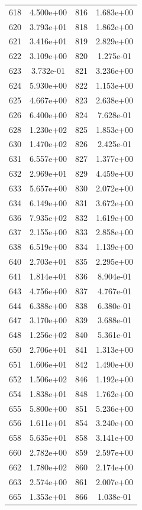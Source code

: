 \documentclass[12pt]{article}
\begin{document}
\begin{longtable}{@{}cccc@{}}
618 & 4.500e+00 & 816 & 1.683e+00 \\
620 & 3.793e+01 & 818 & 1.862e+00 \\
621 & 3.416e+01 & 819 & 2.829e+00 \\
622 & 3.109e+00 & 820 & 1.275e-01 \\
623 & 3.732e-01 & 821 & 3.236e+00 \\
624 & 5.930e+00 & 822 & 1.153e+00 \\
625 & 4.667e+00 & 823 & 2.638e+00 \\
626 & 6.400e+00 & 824 & 7.628e-01 \\
628 & 1.230e+02 & 825 & 1.853e+00 \\
630 & 1.470e+02 & 826 & 2.425e-01 \\
631 & 6.557e+00 & 827 & 1.377e+00 \\
632 & 2.969e+01 & 829 & 4.459e+00 \\
633 & 5.657e+00 & 830 & 2.072e+00 \\
634 & 6.149e+00 & 831 & 3.672e+00 \\
636 & 7.935e+02 & 832 & 1.619e+00 \\
637 & 2.155e+00 & 833 & 2.858e+00 \\
638 & 6.519e+00 & 834 & 1.139e+00 \\
640 & 2.703e+01 & 835 & 2.295e+00 \\
641 & 1.814e+01 & 836 & 8.904e-01 \\
643 & 4.756e+00 & 837 & 4.767e-01 \\
644 & 6.388e+00 & 838 & 6.380e-01 \\
647 & 3.170e+00 & 839 & 3.688e-01 \\
648 & 1.256e+02 & 840 & 5.361e-01 \\
650 & 2.706e+01 & 841 & 1.313e+00 \\
651 & 1.606e+01 & 842 & 1.490e+00 \\
652 & 1.506e+02 & 846 & 1.192e+00 \\
654 & 1.838e+01 & 848 & 1.762e+00 \\
655 & 5.800e+00 & 851 & 5.236e+00 \\
656 & 1.611e+01 & 854 & 3.240e+00 \\
658 & 5.635e+01 & 858 & 3.141e+00 \\
660 & 2.782e+00 & 859 & 2.597e+00 \\
662 & 1.780e+02 & 860 & 2.174e+00 \\
663 & 2.574e+00 & 861 & 2.007e+00 \\
665 & 1.353e+01 & 866 & 1.038e-01 \\

\end{longtable}
\end{document}
